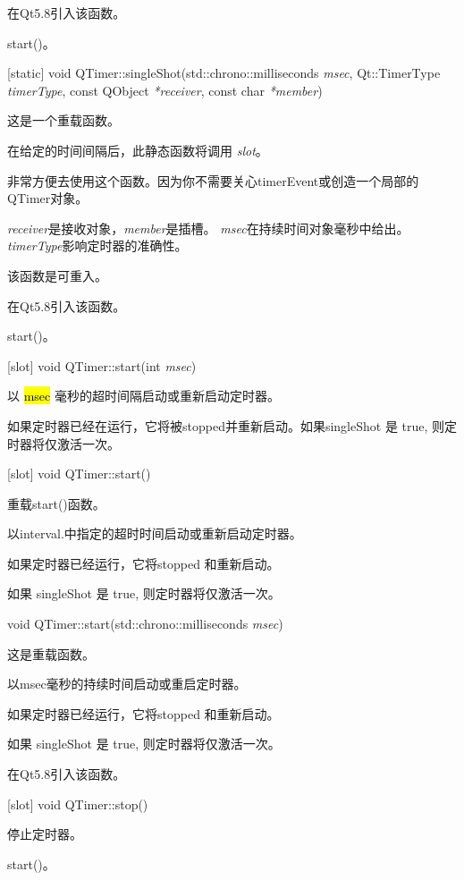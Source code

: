 在Qt5.8引入该函数。

\begin{notice}[另请参阅]
start()。
\end{notice}

[static] void QTimer::singleShot(std::chrono::milliseconds \emph{msec}, Qt::TimerType \emph{timerType}, const QObject \emph{*receiver}, const char \emph{*member})

这是一个重载函数。

在给定的时间间隔后，此静态函数将调用 \emph{slot}。

非常方便去使用这个函数。因为你不需要关心timerEvent或创造一个局部的QTimer对象。

\emph{receiver}是接收对象，\emph{member}是插槽。 \emph{msec}在持续时间对象毫秒中给出。 \emph{timerType}影响定时器的准确性。

\begin{notice}
该函数是可重入。
\end{notice}

在Qt5.8引入该函数。

\begin{notice}[另请参阅]
start()。
\end{notice}

[slot] void QTimer::start(int \emph{msec})

以 \hl{msec} 毫秒的超时间隔启动或重新启动定时器。

如果定时器已经在运行，它将被stopped并重新启动。如果singleShot 是 true, 则定时器将仅激活一次。

[slot] void QTimer::start()

重载start()函数。

以interval.中指定的超时时间启动或重新启动定时器。

如果定时器已经运行，它将stopped 和重新启动。

如果 singleShot 是 true, 则定时器将仅激活一次。

void QTimer::start(std::chrono::milliseconds \emph{msec})

这是重载函数。

以msec毫秒的持续时间启动或重启定时器。

如果定时器已经运行，它将stopped 和重新启动。

如果 singleShot 是 true, 则定时器将仅激活一次。

在Qt5.8引入该函数。

[slot] void QTimer::stop()

停止定时器。

\begin{notice}[另请参阅]
start()。
\end{notice}

